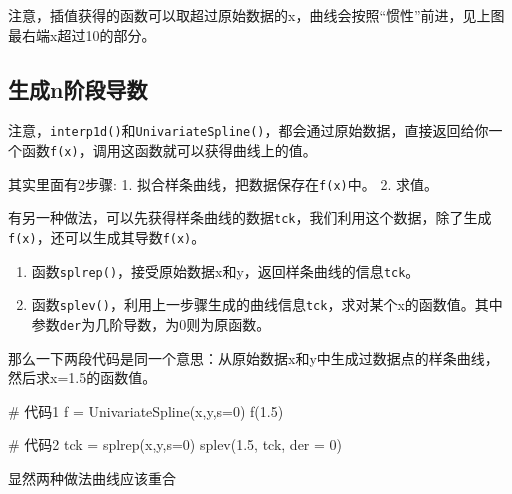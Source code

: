 \documentclass[
  letterpaper,
  DIV=11,
  numbers=noendperiod]{scrreprt}
\newenvironment{Shaded}{\begin{snugshade}}{\end{snugshade}}
\newcommand{\NormalTok}[1]{\textcolor[rgb]{0.00,0.23,0.31}{#1}}
\providecommand{\tightlist}{%
  \setlength{\itemsep}{0pt}\setlength{\parskip}{0pt}}\usepackage{longtable,booktabs,array}
\begin{document}
注意，插值获得的函数可以取超过原始数据的x，曲线会按照``惯性''前进，见上图最右端x超过10的部分。

\hypertarget{ux751fux6210nux9636ux6bb5ux5bfcux6570}{%
\subsection{生成n阶段导数}\label{ux751fux6210nux9636ux6bb5ux5bfcux6570}}

注意，\texttt{interp1d()}和\texttt{UnivariateSpline()}，都会通过原始数据，直接返回给你一个函数\texttt{f(x)}，调用这函数就可以获得曲线上的值。

其实里面有2步骤: 1. 拟合样条曲线，把数据保存在\texttt{f(x)}中。 2.
求值。

有另一种做法，可以先获得样条曲线的数据\texttt{tck}，我们利用这个数据，除了生成\texttt{f(x)}，还可以生成其导数\texttt{f\textquotesingle{}(x)}。

\begin{enumerate}
\def\labelenumi{\arabic{enumi}.}
\tightlist
\item
  函数\texttt{splrep()}，接受原始数据x和y，返回样条曲线的信息\texttt{tck}。
\item
  函数\texttt{splev()}，利用上一步骤生成的曲线信息\texttt{tck}，求对某个x的函数值。其中参数\texttt{der}为几阶导数，为0则为原函数。
\end{enumerate}

那么一下两段代码是同一个意思：从原始数据x和y中生成过数据点的样条曲线，然后求x=1.5的函数值。

\begin{Shaded}
\begin{Highlighting}[]
\NormalTok{\# 代码1}
\NormalTok{f = UnivariateSpline(x,y,s=0)}
\NormalTok{f(1.5)}
\end{Highlighting}
\end{Shaded}

\begin{Shaded}
\begin{Highlighting}[]
\NormalTok{\# 代码2}
\NormalTok{tck = splrep(x,y,s=0)}
\NormalTok{splev(1.5, tck, der = 0)}
\end{Highlighting}
\end{Shaded}

显然两种做法曲线应该重合
\end{document}
